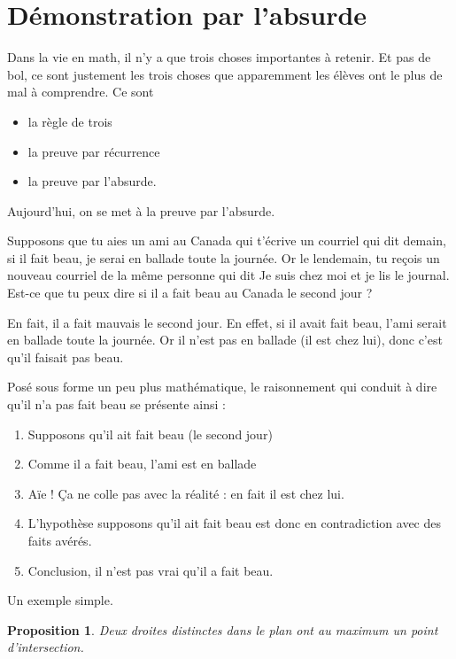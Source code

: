 \documentclass[a4paper,12pt]{book}
\newcounter{numtho}
\theoremstyle{mes_exemples}	\newtheorem{exemple}[numtho]{Exemple}
\theoremstyle{mes_tho}
\newtheorem{proposition}[numtho]{Proposition}
\begin{document}
\section{Démonstration par l'absurde}

Dans la vie en math, il n'y a que trois choses importantes à retenir. Et pas de bol, ce sont justement les trois choses que apparemment les élèves ont le plus de mal à comprendre. Ce sont
\begin{itemize}
\item la règle de trois
\item la preuve par récurrence
\item la preuve par l'absurde.
\end{itemize}
Aujourd'hui, on se met à la preuve par l'absurde.

Supposons que tu aies un ami au Canada qui t'écrive un courriel qui dit \og demain, si il fait beau, je serai en ballade toute la journée\fg. Or le lendemain, tu reçois un nouveau courriel de la même personne qui dit \og Je suis chez moi et je lis le journal\fg. Est-ce que tu peux dire si il a fait beau au Canada le second jour ?

En fait, il a fait mauvais le second jour. En effet, si il avait fait beau, l'ami serait en ballade toute la journée. Or il n'est pas en ballade (il est chez lui), donc c'est qu'il faisait pas beau.

Posé sous forme un peu plus mathématique, le raisonnement qui conduit à dire qu'il n'a pas fait beau se présente ainsi :
\begin{enumerate}
\item Supposons qu'il ait fait beau (le second jour)
\item Comme il a fait beau, l'ami est en ballade
\item Aïe ! Ça ne colle pas avec la réalité : en fait il est chez lui.
\item L'hypothèse \og supposons qu'il ait fait beau\fg{}  est donc en contradiction avec des faits avérés.
\item Conclusion, il n'est pas vrai qu'il a fait beau.
\end{enumerate}

Un exemple simple.
\begin{proposition}
Deux droites distinctes dans le plan ont au maximum un point d'intersection.
\end{proposition}
\end{document}

